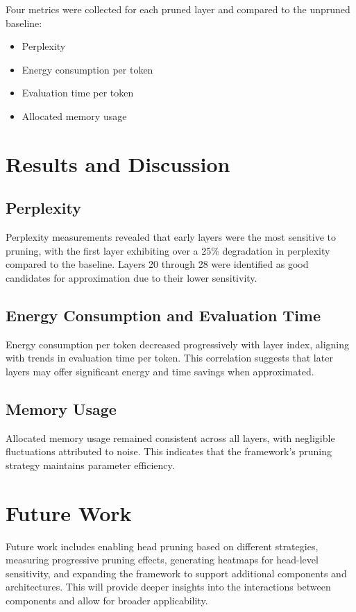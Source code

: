 \documentclass[conference]{IEEEtran}
\begin{document}
    Four metrics were collected for each pruned layer and compared to the unpruned baseline:
    \begin{itemize}
        \item Perplexity
        \item Energy consumption per token
        \item Evaluation time per token
        \item Allocated memory usage
    \end{itemize}

    \section{Results and Discussion}
    \subsection{Perplexity}
    Perplexity measurements revealed that early layers were the most sensitive to pruning, with the first layer exhibiting over a 25\% degradation in perplexity compared to the baseline. Layers 20 through 28 were identified as good candidates for approximation due to their lower sensitivity.

    \subsection{Energy Consumption and Evaluation Time}
    Energy consumption per token decreased progressively with layer index, aligning with trends in evaluation time per token. This correlation suggests that later layers may offer significant energy and time savings when approximated.

    \subsection{Memory Usage}
    Allocated memory usage remained consistent across all layers, with negligible fluctuations attributed to noise. This indicates that the framework's pruning strategy maintains parameter efficiency.

    \section{Future Work}
    Future work includes enabling head pruning based on different strategies, measuring progressive pruning effects, generating heatmaps for head-level sensitivity, and expanding the framework to support additional components and architectures. This will provide deeper insights into the interactions between components and allow for broader applicability.
\end{document}
